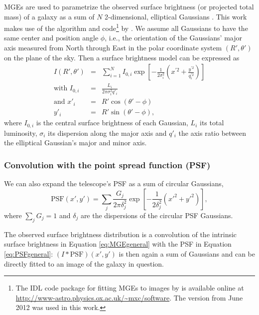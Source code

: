 \documentclass[useAMS,usenatbib]{mnras}
\begin{document}
MGEs are used to parametrize the observed surface brightness (or projected total mass) of a galaxy as a sum of $N$ 2-dimensional, elliptical Gaussians \citep{1991ApJ...366..599B,1992A&A...253..366M,1994A&A...285..723E,1999MNRAS.303..495E}. This work makes use of the algorithm and code\footnote{The IDL code package for fitting MGEs to images by \citet{Cap02} is available online at \url{http://www-astro.physics.ox.ac.uk/~mxc/software}. The version from June 2012 was used in this work.} by \citet{Cap02}. We assume all Gaussians to have the same center and position angle $\phi$, i.e., the orientation of the Gaussians' major axis measured from North through East in the polar coordinate system $(R',\theta')$ on the plane of the sky. Then a surface brightness model can be expressed as
\begin{eqnarray}
I(R',\theta') &=& \sum_{i=1}^{N} I_{0,i} \exp\left[ - \frac{1}{2\sigma_i^2} \left(x^{'2} + \frac{y^{'2}}{q_i^{'2}}\right)\right]\label{eq:MGEgeneral}\\
\text{with } I_{0,i} &=& \frac{L_i}{2\pi \sigma_i^2 q'_i}\label{eq:centralItotalL}\\
\text{and } x'_i &=& R' \cos(\theta' - \phi)\nonumber\\
y'_i &=& R' \sin(\theta' - \phi),\nonumber
\end{eqnarray}
where $I_{0,i}$ is the central surface brightness of each Gaussian, $L_i$ its total luminosity, $\sigma_i$ its dispersion along the major axis and $q'_i$ the axis ratio between the elliptical Gaussian's major and minor axis.

\subsubsection{Convolution with the point spread function (PSF)}

We can also expand the telescope's PSF as a sum of circular Gaussians,
\begin{equation}
\text{PSF}(x',y') = \sum_j \frac{G_j}{2 \pi \delta_j^2} \exp\left[- \frac{1}{2 \delta_j^2} \left({x'}^2 + {y'}^2 \right)\right], \label{eq:PSFgeneral}
\end{equation}
where $\sum_j G_j = 1$ and $\delta_j$ are the dispersions of the circular PSF Gaussians. 

The observed surface brightness distribution is a convolution of the intrinsic surface brightness in Equation \eqref{eq:MGEgeneral} with the PSF in Equation \eqref{eq:PSFgeneral}: $(I \ast \text{PSF}) (x',y')$ is then again a sum of Gaussians and can be directly fitted to an image of the galaxy in question.
\end{document}
